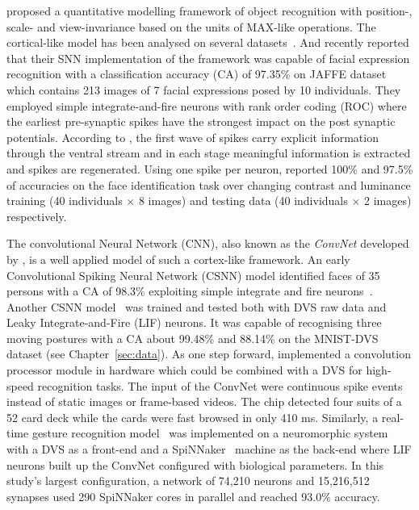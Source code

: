 \cite{riesenhuber1999hierarchical} proposed a quantitative modelling framework of object recognition with position-, scale- and view-invariance based on the units of MAX-like operations.
The cortical-like model has been analysed on several datasets~\citep{serre2007robust}.
And recently \cite{fu_spiking_2012} reported that their SNN implementation of the framework was capable of facial expression recognition with a classification accuracy (CA) of 97.35\% on JAFFE dataset~\citep{lyons1998coding} which contains 213 images of 7 facial expressions posed by 10 individuals.
They employed simple integrate-and-fire neurons with rank order coding (ROC) where  the earliest pre-synaptic spikes have the strongest impact on the post synaptic potentials.
According to \cite{vanrullen_surfing_2002}, the first wave of spikes  carry explicit information through the ventral stream and in each stage meaningful information is extracted and spikes are regenerated. 
Using one spike per neuron, \cite{delorme_face_2001} reported 100\% and 97.5\% of accuracies on the face identification task over changing  contrast and luminance training (40 individuals $\times$ 8 images) and testing data (40 individuals $\times$ 2 images) respectively.

The convolutional Neural Network (CNN), also known as the \textit{ConvNet} developed by \cite{lecun1995convolutional}, is a well applied model of such a cortex-like framework.
An early Convolutional Spiking Neural Network (CSNN) model identified faces of 35 persons with a CA of 98.3\% exploiting simple integrate and fire neurons~\citep{matsugu2002convolutional}.
Another CSNN model~\citep{zhao_feedforward_2014} was trained and tested both with DVS raw data and Leaky Integrate-and-Fire (LIF) neurons.
It was capable of recognising three moving postures with a CA about 99.48\% and 88.14\% on the MNIST-DVS dataset (see Chapter~\ref{sec:data}).
As one step forward, \cite{camunas2012event} implemented a convolution processor module in hardware which could be combined with a DVS for high-speed recognition tasks.
The input of the ConvNet were continuous spike events instead of static images or frame-based videos. 
The chip detected four suits of a 52 card deck while the cards were fast browsed in only 410 ms.
Similarly, a real-time gesture recognition model~\citep{liu2014real} was implemented on a neuromorphic system with a DVS as a front-end and a SpiNNaker~\citep{furber2013overview} machine as the back-end where LIF neurons built up the ConvNet configured with biological parameters.
In this study's largest configuration, a network of 74,210 neurons and 15,216,512 synapses used 290 SpiNNaker cores in parallel and reached 93.0\% accuracy. 

